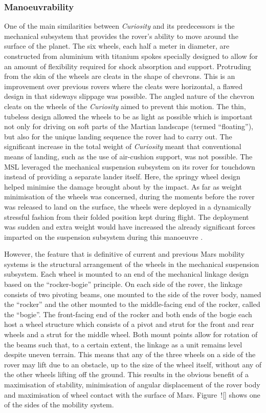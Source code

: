       \subsubsection{Manoeuvrability}
      \label{subsubsec:lit-manoeuvrability}
        One of the main similarities between \textit{Curiosity} and its predecessors is the mechanical subsystem that provides the rover's ability to move around the surface of the planet. The six wheels, each half a meter in diameter, are constructed from aluminium with titanium spokes specially designed to allow for an amount of flexibility required for shock absorption and support. Protruding from the skin of the wheels are cleats in the shape of chevrons. This is an improvement over previous rovers where the cleats were horizontal, a flawed design in that sideways slippage was possible. The angled nature of the chevron cleats on the wheels of the \textit{Curiosity} aimed to prevent this motion. The thin, tubeless design allowed the wheels to be as light as possible which is important not only for driving on soft parts of the Martian landscape (termed ``floating''), but also for the unique landing sequence the rover had to carry out. The significant increase in the total weight of \textit{Curiosity} meant that conventional means of landing, such as the use of air-cushion support, was not possible. The MSL leveraged the mechanical suspension subsystem on its rover for touchdown instead of providing a separate lander itself. Here, the springy wheel design helped minimise the damage brought about by the impact. As far as weight minimisation of the wheels was concerned, during the moments before the rover was released to land on the surface, the wheels were deployed in a dynamically stressful fashion from their folded position kept during flight. The deployment was sudden and extra weight would have increased the already significant forces imparted on the suspension subsystem during this manoeuvre \cite{planetary2014}.
        
        However, the feature that is definitive of current and previous Mars mobility systems is the structural arrangement of the wheels in the mechanical suspension subsystem. Each wheel is mounted to an end of the mechanical linkage design based on the ``rocker-bogie'' principle. On each side of the rover, the linkage consists of two pivoting beams, one mounted to the side of the rover body, named the ``rocker'' and the other mounted to the middle-facing end of the rocker, called the ``bogie''. The front-facing end of the rocker and both ends of the bogie each host a wheel structure which consists of a pivot and strut for the front and rear wheels and a strut for the middle wheel. Both mount points allow for rotation of the beams such that, to a certain extent, the linkage as a unit remains level despite uneven terrain. This means that any of the three wheels on a side of the rover may lift due to an obstacle, up to the size of the wheel itself, without any of the other wheels lifting off the ground. This results in the obvious benefit of a maximisation of stability, minimisation of angular displacement of the rover body and maximisation of wheel contact with the surface of Mars. Figure~![] shows one of the sides of the mobility system.
        
